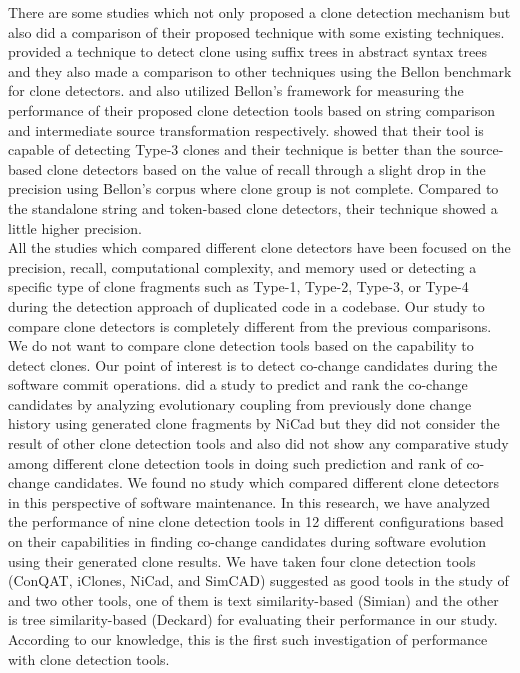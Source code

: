 \documentclass[review]{elsarticle}
\begin{document}
There are some studies which not only proposed a clone detection mechanism but also did a comparison of their proposed technique with some existing techniques. \citet{astDetectionComparisonBellon} provided a technique to detect clone using suffix trees in abstract syntax trees and they also made a comparison to other techniques using the Bellon benchmark for clone detectors. \citet{DucasseStringMatchingCloneBallon} and \citet{CloneIntermediateRepresentationBallon} also utilized Bellon’s framework for measuring the performance of their proposed clone detection tools based on string comparison and intermediate source transformation respectively. \citet{CloneIntermediateRepresentationBallon} showed that their tool is capable of detecting Type-3 clones and their technique is better than the source-based clone detectors based on the value of recall through a slight drop in the precision using Bellon’s corpus where clone group is not complete. Compared to the standalone string and token-based clone detectors, their technique showed a little higher precision.\\
All the studies which compared different clone detectors have been focused on the precision, recall, computational complexity, and memory used or detecting a specific type of clone fragments such as Type-1, Type-2, Type-3, or Type-4 during the detection approach of duplicated code in a codebase. Our study to compare clone detectors is completely different from the previous comparisons. We do not want to compare clone detection tools based on the capability to detect clones. Our point of interest is to detect co-change candidates during the software commit operations. \citet{Mondal-2014-PRC-2597073-2597104rankingCoChange} did a study to predict and rank the co-change candidates by analyzing evolutionary coupling from previously done change history using generated clone fragments by NiCad but they did not consider the result of other clone detection tools and also did not show any comparative study among different clone detection tools in doing such prediction and rank of co-change candidates. We found no study which compared different clone detectors in this perspective of software maintenance. In this research, we have analyzed the performance of nine clone detection tools in 12 different configurations based on their capabilities in finding co-change candidates during software evolution using their generated clone results. We have taken four clone detection tools (ConQAT, iClones, NiCad, and  SimCAD) suggested as good tools in the study of \citet{jeff-evaluating} and two other tools, one of them is text similarity-based (Simian) and the other is tree similarity-based (Deckard) for evaluating their performance in our study. According to our knowledge, this is the first such investigation of performance with clone detection tools. 
\end{document}
